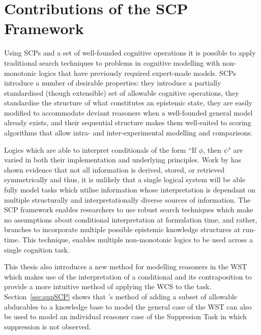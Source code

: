 \section{Contributions of the SCP Framework} \label{sec:contributions}
Using SCPs and a set of well-founded cognitive operations it is possible to apply traditional search techniques to problems in cognitive modelling with non-monotonic logics that have previously required expert-made models. SCPs introduce a number of desirable properties: they introduce a partially standardised (though extensible) set of allowable cognitive operations, they standardise the structure of what constitutes an epistemic state, they are easily modified to accommodate deviant reasoners when a well-founded general model already exists, and their sequential structure makes them well-suited to scoring algorithms that allow intra- and inter-experimental modelling and comparisons.

Logics which are able to interpret conditionals of the form ``If $\phi$, then $\psi$" are varied in both their implementation and underlying principles. Work by \cite{heit2005defending} has shown evidence that not all information is derived, stored, or retrieved symmetrically and thus, it is unlikely that a single logical system will be able fully model tasks which utilise information whose interpretation is dependant on multiple structurally and interpretationally diverse sources of information. The SCP framework enables researchers to use robust search techniques which make no assumptions about conditional interpretation at formulation time, and rather, branches to incorporate multiple possible epistemic knowledge structures at run-time. This technique, enables multiple non-monotonic logics to be used across a single cognition task.

This thesis also introduces a new method for modelling reasoners in the WST which makes use of the interpretation of a conditional and its contraposition to provide a more intuitive method of applying the WCS to the task. Section~\ref{sec:supSCP} shows that \cite{dietz2014modeling}'s method of adding a subset of allowable abducables to a knowledge base to model the general case of the WST can also be used to model an individual reasoner case of the Suppresion Task in which suppression is not observed.

